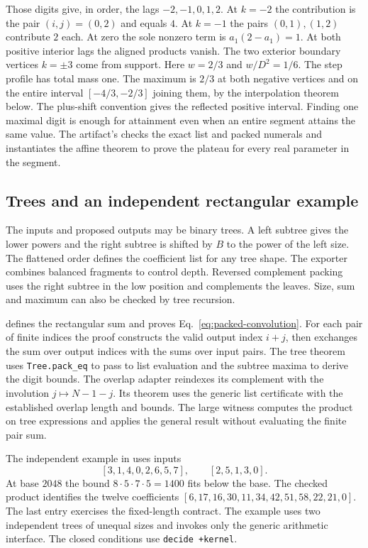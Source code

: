 \documentclass[sigplan,10pt,anonymous,review,balance=false]{acmart}
\newcommand{\leanid}[1]{\texttt{#1}}
\begin{document}
Those digits give, in order, the lags $-2,-1,0,1,2$. At $k=-2$
the contribution is the pair $(i,j)=(0,2)$ and equals $4$.
At $k=-1$ the pairs $(0,1),(1,2)$ contribute $2$ each.
At zero the sole nonzero term is $a_1(2-a_1)=1$.
At both positive interior lags the aligned products vanish.
The two exterior boundary vertices $k=\pm 3$ come from
support. Here $w=2/3$ and $w/D^2=1/6$. The step profile
has total mass one. The maximum is $2/3$ at both negative
vertices and on the entire interval $[-4/3,-2/3]$ joining
them, by the interpolation theorem below. The plus-shift
convention gives the reflected positive interval. Finding
one maximal digit is enough for attainment even when an
entire segment attains the same value.
The artifact's  checks the exact
list and packed numerals and instantiates the affine theorem to
prove the plateau for every real parameter in the segment.

\subsection{Trees and an independent rectangular example}

The inputs and proposed outputs may be binary trees. A left
subtree gives the lower powers and the right subtree is shifted by
$B$ to the power of the left size. The flattened order defines
the coefficient list for any tree shape. The exporter combines
balanced fragments to control depth. Reversed complement packing
uses the right subtree in the low position and complements the
leaves. Size, sum and maximum can also be checked by tree
recursion.

 defines the rectangular
sum and proves Eq.~\eqref{eq:packed-convolution}. For each pair of
finite indices the proof constructs the valid output index $i+j$,
then exchanges the sum over output indices with the sums over
input pairs. The tree theorem 
uses \leanid{Tree.pack\_eq} to pass to list evaluation and the
subtree maxima to derive the digit bounds. The overlap adapter
reindexes its complement with the involution $j\mapsto N-1-j$.
Its  theorem uses the generic list
certificate with the established overlap length and bounds.
The large witness computes the product on tree expressions and
applies the general result without evaluating the finite pair sum.

The independent example in 
uses inputs
\[
 [3,1,4,0,2,6,5,7],\qquad [2,5,1,3,0].
\]
At base $2048$ the bound $8\cdot5\cdot7\cdot5=1400$ fits below
the base. The checked product identifies the twelve coefficients
$[6,17,16,30,11,34,42,51,58,22,21,0]$. The last entry exercises
the fixed-length contract. The example uses two independent
trees of unequal sizes and invokes only the generic arithmetic
interface. The closed conditions use \leanid{decide +kernel}.
\end{document}
